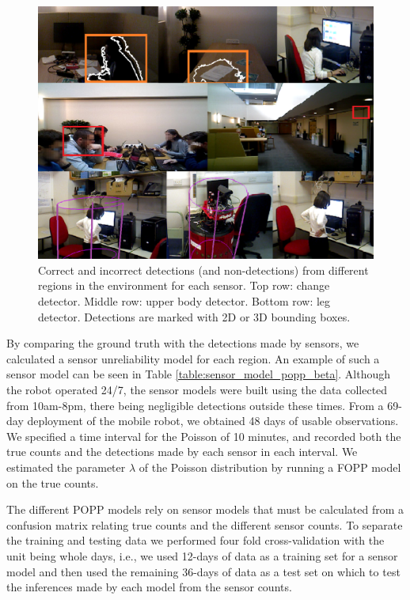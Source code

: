 \begin{figure}[t]
	\centering
	\includegraphics[width=0.95\columnwidth]{./figures/sensor_images.png}
	\caption{Correct and incorrect detections (and non-detections) from different regions in the environment for each sensor. Top row: change detector. Middle row: upper body detector. Bottom row: leg detector. Detections are marked with 2D or 3D bounding boxes.}
	\label{fig:single_sensor_rate_transformation}
\end{figure}

By comparing the ground truth with the detections made by sensors, we calculated a sensor unreliability model for each region. An example of such a sensor model can be seen in Table \ref{table:sensor_model_popp_beta}. Although the robot operated 24/7, the sensor models were built using the data collected from 10am-8pm, there being negligible detections outside these times. From a 69-day deployment of the mobile robot, we obtained 48 days of usable observations. We specified a time interval for the Poisson of 10 minutes, and recorded both the true counts and the detections made by each sensor in each interval. We estimated the parameter $\lambda$ of the Poisson distribution by running a FOPP model on the true counts. 

The different POPP models rely on sensor models that must be calculated from a confusion matrix relating true counts and the different sensor counts. To separate the training and testing data we performed four fold cross-validation with the unit being whole days, i.e., we used 12-days of data as a training set for a sensor model and then used the remaining 36-days of data as a test set on which to test the inferences made by each model from the sensor counts.

